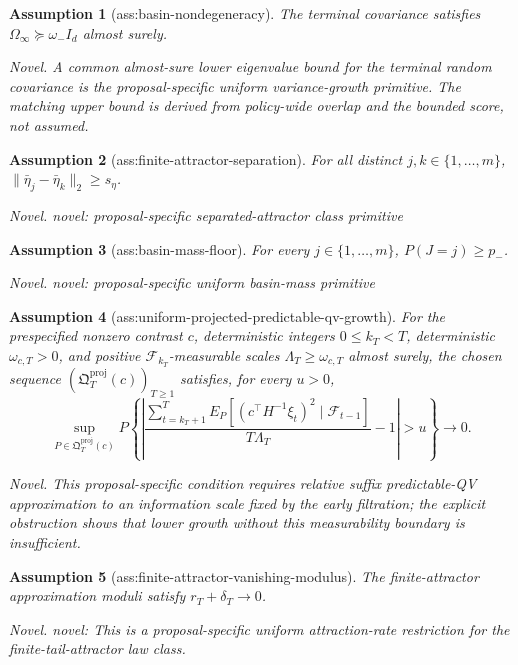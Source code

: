 \documentclass{article}
\newtheorem{assumption}{Assumption}
\begin{document}
\begin{assumption}[ass:basin-nondegeneracy]\label{ass:basin-nondegeneracy}
The terminal covariance satisfies \(\Omega_\infty\succeq\omega_-I_d\) almost surely.
\par\smallskip\noindent\emph{Novel.} A common almost-sure lower eigenvalue bound for the terminal random covariance is the proposal-specific uniform variance-growth primitive. The matching upper bound is derived from policy-wide overlap and the bounded score, not assumed.
\end{assumption}

\begin{assumption}[ass:finite-attractor-separation]\label{ass:finite-attractor-separation}
For all distinct \(j,k\in\{1,\ldots,m\}\), \(\|\bar\eta_j-\bar\eta_k\|_2\ge s_\eta\).
\par\smallskip\noindent\emph{Novel.} novel: proposal-specific separated-attractor class primitive
\end{assumption}

\begin{assumption}[ass:basin-mass-floor]\label{ass:basin-mass-floor}
For every \(j\in\{1,\ldots,m\}\), \(P(J=j)\ge p_-\).
\par\smallskip\noindent\emph{Novel.} novel: proposal-specific uniform basin-mass primitive
\end{assumption}

\begin{assumption}[ass:uniform-projected-predictable-qv-growth]\label{ass:uniform-projected-predictable-qv-growth}
For the prespecified nonzero contrast \(c\), deterministic integers \(0\le k_T<T\), deterministic \(\omega_{c,T}>0\), and positive \(\mathcal F_{k_T}\)-measurable scales \(\Lambda_T\ge\omega_{c,T}\) almost surely, the chosen sequence \((\mathfrak Q_T^{\mathrm{proj}}(c))_{T\ge1}\) satisfies, for every \(u>0\),
\[
 \sup_{P\in\mathfrak Q_T^{\mathrm{proj}}(c)}
 P\!\left\{
 \left|
 \frac{\sum_{t=k_T+1}^T E_P[(c^\top H^{-1}\xi_t)^2\mid\mathcal F_{t-1}]}
 {T\Lambda_T}-1
 \right|>u
 \right\}\longrightarrow0.
\]
\par\smallskip\noindent\emph{Novel.} This proposal-specific condition requires relative suffix predictable-QV approximation to an information scale fixed by the early filtration; the explicit obstruction shows that lower growth without this measurability boundary is insufficient.
\end{assumption}

\begin{assumption}[ass:finite-attractor-vanishing-modulus]\label{ass:finite-attractor-vanishing-modulus}
The finite-attractor approximation moduli satisfy \(r_T+\delta_T\to0\).
\par\smallskip\noindent\emph{Novel.} novel: This is a proposal-specific uniform attraction-rate restriction for the finite-tail-attractor law class.
\end{assumption}
\end{document}
